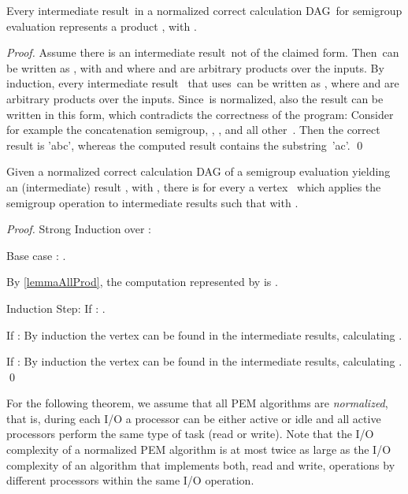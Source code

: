 \documentclass[envcountsame]{llncs}
\begin{document}
\begin{lemma}
\label{lemmaAllProd}
Every intermediate result~\intermediateResult in a normalized correct calculation DAG~\calculationDAG for semigroup evaluation  represents a product , with .
\end{lemma}

\begin{proof}
Assume there is an intermediate result~\intermediateResult not of the claimed form.
Then~\intermediateResult can be written as , with  and where  and  are arbitrary products over the inputs.
By induction, every intermediate result~ that uses~\intermediateResult can be written as , where  and  are arbitrary products over the inputs.
Since~\calculationDAG is normalized, also the result can be written in this form, which contradicts the correctness of the program:
Consider for example the concatenation semigroup, , ,  and all other~.
Then the correct result is 'abc', whereas the computed result contains the substring~'ac'.
\qed
\end{proof}


\begin{lemma}
\label{lemmaEverySemigroupOperation}
Given a normalized correct calculation DAG of a semigroup evaluation yielding an (intermediate) result , with , there is for every  a vertex~ which applies the semigroup operation to intermediate results such that  with .
\end{lemma}
\begin{proof}
Strong Induction over :

Base case :  . \checkmark

By \autoref{lemmaAllProd}, the computation represented by  is .

Induction Step: 
If : \checkmark.

If : By induction the vertex can be found in the intermediate results, calculating . \checkmark


If : By induction the vertex can be found in the intermediate results, calculating . \checkmark
\qed
\end{proof}

For the following theorem, we assume that all PEM algorithms are {\em normalized}, that is, during each I/O a processor can be either active or idle and all active processors perform the same type of task (read or write). 
Note that the I/O complexity of a normalized PEM algorithm is at most twice as large as the I/O complexity of an algorithm that implements both, read and write, operations by different processors within the same I/O operation. 
\end{document}
